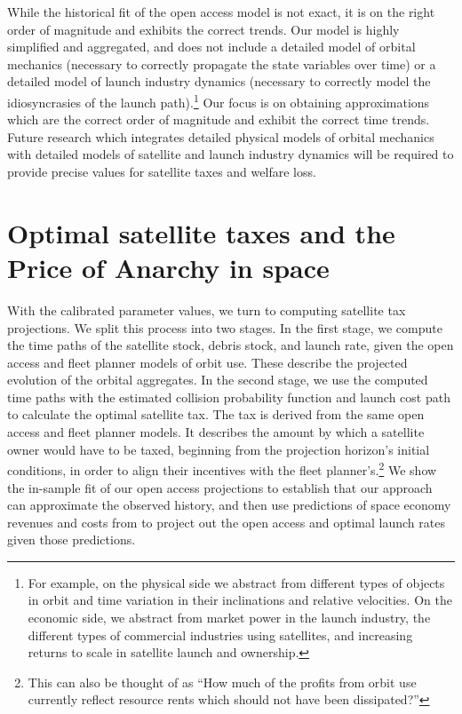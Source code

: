 \documentclass[12pt]{article}
\begin{document}
While the historical fit of the open access model is not exact, it is on the right order of magnitude and exhibits the correct trends. Our model is highly simplified and aggregated, and does not include a detailed model of orbital mechanics (necessary to correctly propagate the state variables over time) or a detailed model of launch industry dynamics (necessary to correctly model the idiosyncrasies of the launch path).\footnote{For example, on the physical side we abstract from different types of objects in orbit and time variation in their inclinations and relative velocities. On the economic side, we abstract from market power in the launch industry, the different types of commercial industries using satellites, and increasing returns to scale in satellite launch and ownership.} Our focus is on obtaining approximations which are the correct order of magnitude and exhibit the correct time trends. Future research which integrates detailed physical models of orbital mechanics with detailed models of satellite and launch industry dynamics will be required to provide precise values for satellite taxes and welfare loss.

\section{Optimal satellite taxes and the Price of Anarchy in space}

With the calibrated parameter values, we turn to computing satellite tax projections. We split this process into two stages. In the first stage, we compute the time paths of the satellite stock, debris stock, and launch rate, given the open access and fleet planner models of orbit use. These describe the projected evolution of the orbital aggregates. In the second stage, we use the computed time paths with the estimated collision probability function and launch cost path to calculate the optimal satellite tax. The tax is derived from the same open access and fleet planner models. It describes the amount by which a satellite owner would have to be taxed, beginning from the projection horizon's initial conditions, in order to align their incentives with the fleet planner's.\footnote{This can also be thought of as ``How much of the profits from orbit use currently reflect resource rents which should not have been dissipated?'' } We show the in-sample fit of our open access projections to establish that our approach can approximate the observed history, and then use predictions of space economy revenues and costs from \citep{MSreport} to project out the open access and optimal launch rates given those predictions. 
\end{document}
